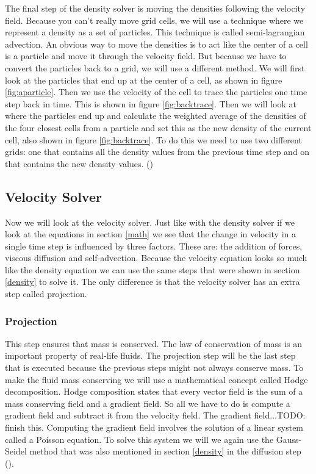 \documentclass[a4paper,12pt,titlepage]{article}
\begin{document}
The final step of the density solver is moving the densities following the velocity
field. Because you can't really move grid cells, we will use a technique where we
represent a density as a set of particles. This technique is called semi-lagrangian
advection. An obvious way to move the densities is to act like the center of a
cell is a particle and move it through the velocity field. But because we have
to convert the particles back to a grid, we will use a different method. We will
first look at the particles that end up at the center of a cell, as shown in
figure \ref{fig:aparticle}. Then we use the velocity of the cell to trace the particles
one time step back in time. This is shown in figure \ref{fig:backtrace}. Then we will
look at where the particles end up and calculate the weighted average of the
densities of the four closest cells from a particle and set this as the new density
of the current cell, also shown in figure \ref{fig:backtrace}. To do this we need to use
two different grids: one that contains all the density values from the previous
time step and on that contains the new density values. (\cite{josstam})
 
\subsection{Velocity Solver} \label{velocity}
Now we will look at the velocity solver. Just like with the density solver if we
look at the equations in section \ref{math} we see that the change in velocity
in a single time step is influenced by three factors. These are: the addition of
forces, viscous diffusion and self-advection. Because the velocity equation
looks so much like the density equation we can use the same steps that were shown
in section \ref{density} to solve it. The only difference is that the velocity
solver has an extra step called projection.

\subsubsection{Projection}
This step ensures that mass is conserved. 
The law of conservation of mass is an important property of real-life fluids.
The projection step will be the last step that is executed because the previous
steps might not always conserve mass. To make the fluid mass conserving we will
use a mathematical concept called Hodge decomposition. Hodge composition states
that every vector field is the sum of a mass conserving field and a gradient field.
So all we have to do is compute a gradient field and subtract it from the velocity
field. The gradient field...TODO: finish this.
Computing the gradient field involves the solution of a linear system called a Poisson equation.
To solve this system we will we again use the Gauss-Seidel method that was also mentioned in section \ref{density} in the diffusion step (\cite{josstam}).
\end{document}
